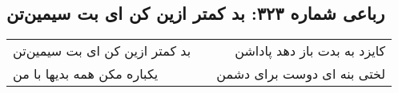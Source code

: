 \begin{center}
\section*{رباعی شماره ۳۲۳: بد کمتر ازین کن ای بت سیمین‌تن}
\label{sec:sh323}
\begin{longtable}{l p{0.5cm} r}
بد کمتر ازین کن ای بت سیمین‌تن
&&
کایزد به بدت باز دهد پاداشن
\\
یکباره مکن همه بدیها با من
&&
لختی بنه ای دوست برای دشمن
\\
\end{longtable}
\end{center}
